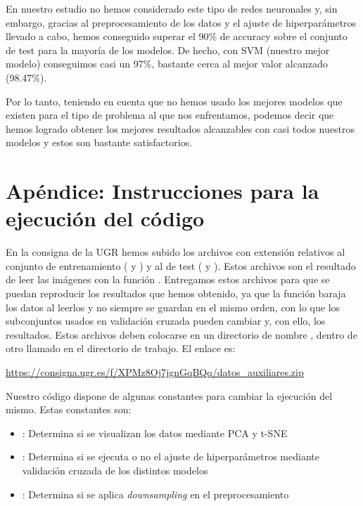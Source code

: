 \documentclass[a4]{article}
\begin{document}
En nuestro estudio no hemos considerado este tipo de redes neuronales y, sin embargo, gracias al preprocesamiento de los datos y el ajuste de hiperparámetros llevado a cabo, hemos conseguido superar el 90\% de accuracy sobre el conjunto de test para la mayoría de los modelos. De hecho, con SVM (nuestro mejor modelo) conseguimos casi un 97\%, bastante cerca al mejor valor alcanzado (98.47\%). 

Por lo tanto, teniendo en cuenta que no hemos usado los mejores modelos que existen para el tipo de problema al que nos enfrentamos, podemos decir que hemos logrado obtener los mejores resultados alcanzables con casi todos nuestros modelos y estos son bastante satisfactorios. 

 
\newpage
\section{Apéndice: Instrucciones para la ejecución del código}

En la consigna de la UGR hemos subido los archivos con extensión  relativos al conjunto de entrenamiento ( y ) y al de test ( y ). Estos archivos son el resultado de leer las imágenes con la función . Entregamos estos archivos para que se puedan reproducir los resultados que hemos obtenido, ya que la función  baraja los datos al leerlos y no siempre se guardan en el mismo orden, con lo que los subconjuntos usados en validación cruzada pueden cambiar y, con ello, los resultados. Estos archivos deben colocarse en un directorio de nombre , dentro de otro llamado  en el directorio de trabajo. El enlace es:

\href{https://consigna.ugr.es/f/XPMz8Oj7jgnGqBQq/datos_auxiliares.zip}{https://consigna.ugr.es/f/XPMz8Oj7jgnGqBQq/datos\_auxiliares.zip}

Nuestro código dispone de algunas constantes para cambiar la ejecución del mismo. Estas constantes son:

\begin{itemize}
    \item {}: Determina si se visualizan los datos mediante PCA y t-SNE
    \item {}: Determina si se ejecuta o no el ajuste de hiperparámetros mediante validación cruzada de los distintos modelos
    \item {}: Determina si se aplica \textit{downsampling} en el preprocesamiento
\end{itemize}
\end{document}
